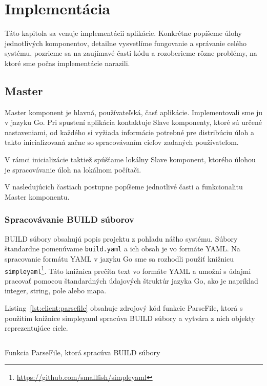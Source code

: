 \chapter{Implement\'{a}cia}
\label{ch:impl}

Táto kapitola sa venuje implementácii aplikácie. Konkrétne popíšeme úlohy
jednotlivých komponentov, detailne vysvetlíme fungovanie a správanie celého
systému, pozrieme sa na zaujímavé časti kódu a rozoberieme rôzne problémy,
na ktoré sme počas implementácie narazili.

\section{Master}
\label{sec:master}

Master komponent je hlavná, používateľská, časť aplikácie. Implementovali sme ju
v jazyku Go. Pri spustení aplikácia kontaktuje Slave komponenty, ktoré sú
určené nastaveniami, od každého si vyžiada informácie potrebné pre distribúciu
úloh a takto inicializovaná začne so spracovávaním cieľov zadaných používateľom.

V rámci inicializácie taktiež spúšťame lokálny Slave komponent, ktorého úlohou je
spracovávanie úloh na lokálnom počítači.

V nasledujúcich častiach postupne popíšeme jednotlivé časti a funkcionalitu Master
komponentu.

\subsection{Spracov\'{a}vanie BUILD s\'{u}borov}
\label{sec:master:buildfile}

BUILD súbory obsahujú popis projektu z pohľadu nášho systému. Súbory štandardne
pomenúvame \texttt{build.yaml} a ich obsah je vo formáte YAML\@. Na spracovanie
formátu YAML v jazyku Go sme sa rozhodli použiť knižnicu
\texttt{simpleyaml}\footnote{\url{https://github.com/smallfish/simpleyaml}}.
Táto knižnica prečíta text vo formáte YAML a umožní s údajmi pracovať pomocou
štandardných údajových štruktúr jazyka Go, ako je napríklad integer, string,
pole alebo mapa.

Listing~\ref{lst:client:parsefile} obsahuje zdrojový kód funkcie ParseFile, ktorá
s použitím knižnice simpleyaml spracúva BUILD súbory a vytvára z nich objekty
reprezentujúce ciele.

\begin{listing}[H]
  \inputminted[frame=lines,framesep=2mm,linenos,fontsize=\scriptsize,firstline=65,lastline=96]{go}{/home/pepol/src/imterra/forge/client/target/parse.go}
  \caption[Funkcia ParseFile]{Funkcia ParseFile, ktorá spracúva BUILD súbory}
  \label{lst:client:parsefile}
\end{listing}

